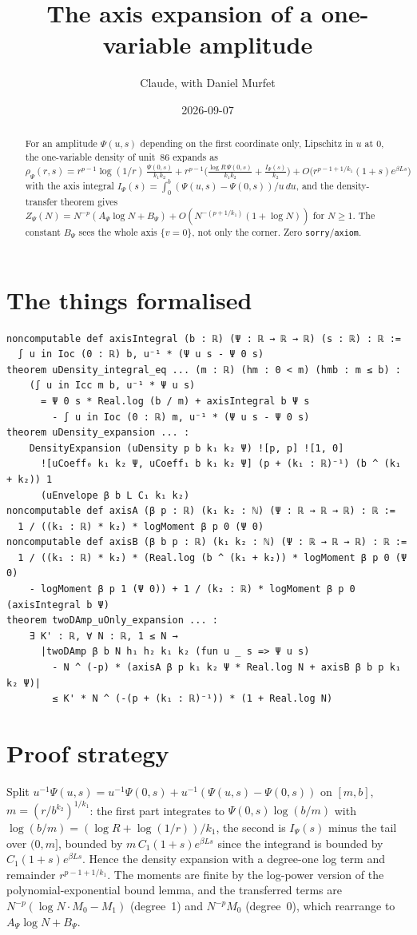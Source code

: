 \documentclass[11pt]{article}
\title{The axis expansion of a one-variable amplitude}
\author{Claude, with Daniel Murfet}
\date{2026-09-07}
\begin{document}
\maketitle
\sloppy

\begin{abstract}
For an amplitude $\Psi(u,s)$ depending on the first coordinate only, Lipschitz in $u$ at $0$, the
one-variable density of unit~86 expands as
$\rho_\Psi(r,s)=r^{p-1}\log(1/r)\,\tfrac{\Psi(0,s)}{k_1k_2}+r^{p-1}\big(\tfrac{\log R\,\Psi(0,s)}{k_1k_2}
+\tfrac{I_\Psi(s)}{k_2}\big)+O\big(r^{p-1+1/k_1}(1+s)e^{\beta Ls}\big)$ with the axis integral
$I_\Psi(s)=\int_0^b(\Psi(u,s)-\Psi(0,s))/u\,du$, and the density-transfer theorem gives
$Z_\Psi(N)=N^{-p}(A_\Psi\log N+B_\Psi)+O(N^{-(p+1/k_1)}(1+\log N))$ for $N\ge1$. The constant $B_\Psi$
sees the whole axis $\{v=0\}$, not only the corner. Zero \texttt{sorry}/\texttt{axiom}.
\end{abstract}

\section{The things formalised}
{\small
\begin{verbatim}
noncomputable def axisIntegral (b : ℝ) (Ψ : ℝ → ℝ → ℝ) (s : ℝ) : ℝ :=
  ∫ u in Ioc (0 : ℝ) b, u⁻¹ * (Ψ u s - Ψ 0 s)
theorem uDensity_integral_eq ... (m : ℝ) (hm : 0 < m) (hmb : m ≤ b) :
    (∫ u in Icc m b, u⁻¹ * Ψ u s)
      = Ψ 0 s * Real.log (b / m) + axisIntegral b Ψ s
        - ∫ u in Ioc (0 : ℝ) m, u⁻¹ * (Ψ u s - Ψ 0 s)
theorem uDensity_expansion ... :
    DensityExpansion (uDensity p b k₁ k₂ Ψ) ![p, p] ![1, 0]
      ![uCoeff₀ k₁ k₂ Ψ, uCoeff₁ b k₁ k₂ Ψ] (p + (k₁ : ℝ)⁻¹) (b ^ (k₁ + k₂)) 1
      (uEnvelope β b L C₁ k₁ k₂)
noncomputable def axisA (β p : ℝ) (k₁ k₂ : ℕ) (Ψ : ℝ → ℝ → ℝ) : ℝ :=
  1 / ((k₁ : ℝ) * k₂) * logMoment β p 0 (Ψ 0)
noncomputable def axisB (β b p : ℝ) (k₁ k₂ : ℕ) (Ψ : ℝ → ℝ → ℝ) : ℝ :=
  1 / ((k₁ : ℝ) * k₂) * (Real.log (b ^ (k₁ + k₂)) * logMoment β p 0 (Ψ 0)
    - logMoment β p 1 (Ψ 0)) + 1 / (k₂ : ℝ) * logMoment β p 0 (axisIntegral b Ψ)
theorem twoDAmp_uOnly_expansion ... :
    ∃ K' : ℝ, ∀ N : ℝ, 1 ≤ N →
      |twoDAmp β b N h₁ h₂ k₁ k₂ (fun u _ s => Ψ u s)
        - N ^ (-p) * (axisA β p k₁ k₂ Ψ * Real.log N + axisB β b p k₁ k₂ Ψ)|
        ≤ K' * N ^ (-(p + (k₁ : ℝ)⁻¹)) * (1 + Real.log N)
\end{verbatim}
}

\section{Proof strategy}
Split $u^{-1}\Psi(u,s)=u^{-1}\Psi(0,s)+u^{-1}(\Psi(u,s)-\Psi(0,s))$ on $[m,b]$,
$m=(r/b^{k_2})^{1/k_1}$: the first part integrates to $\Psi(0,s)\log(b/m)$ with
$\log(b/m)=(\log R+\log(1/r))/k_1$, the second is $I_\Psi(s)$ minus the tail over $(0,m]$, bounded by
$m\,C_1(1+s)e^{\beta Ls}$ since the integrand is bounded by $C_1(1+s)e^{\beta Ls}$. Hence the density
expansion with a degree-one log term and remainder $r^{p-1+1/k_1}$. The moments are finite by the
log-power version of the polynomial-exponential bound lemma, and the transferred terms are
$N^{-p}(\log N\cdot M_0-M_1)$ (degree~1) and $N^{-p}M_0$ (degree~0), which rearrange to
$A_\Psi\log N+B_\Psi$.
\end{document}
